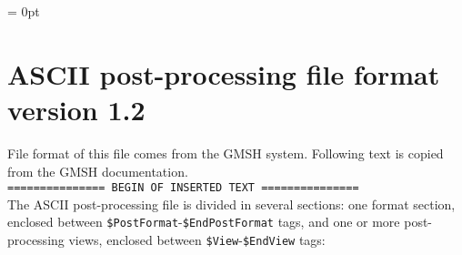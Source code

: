 %
%
%
%
\parindent = 0pt

\section*{ASCII post-processing file format version 1.2}
File format of this file comes from the GMSH system. 
Following text is copied from the GMSH documentation.\\[0.5em]

{\tt =============== BEGIN OF INSERTED TEXT ===============}\\[0.3em] 

The ASCII post-processing file is divided in several sections: one format
section, enclosed between {\tt \$PostFormat}-{\tt \$EndPostFormat} tags, and
one or more post-processing views, enclosed between
{\tt \$View}-{\tt \$EndView} tags:

